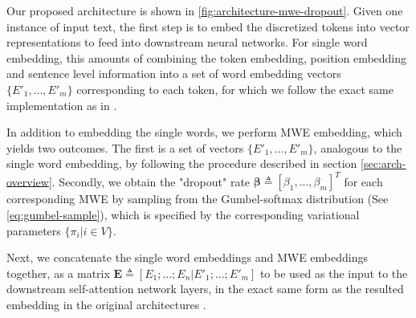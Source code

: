 

Our proposed architecture is shown in \autoref{fig:architecture-mwe-dropout}. 
Given one instance of input text, the first step is to embed the discretized tokens into vector representations to feed into downstream neural networks.
For single word embedding, this amounts of combining the token embedding, position embedding and sentence level information into 
a set of word embedding vectors $\{E'_1, ..., E'_m\}$ corresponding to each token, for which we follow the exact same implementation as in \cite{devlin2018bert}.

In addition to embedding the single words, 
we perform MWE embedding, which yields two outcomes.
The first is a set of vectors $\{E'_1, ..., E'_m\}$, analogous to the single word embedding, 
by following the procedure described in section \autoref{sec:arch-overview}. 
Secondly, we obtain the "dropout" rate $\bm{\beta} \triangleq [\beta_1, ..., \beta_m]^T$ for each corresponding MWE 
by sampling from the Gumbel-softmax distribution (See \autoref{eq:gumbel-sample}), which is specified by the corresponding variational parameters $\{\pi_i \vert i \in V\}$.



Next, we concatenate the single word embeddings and MWE embeddings together, as
a matrix $\mathbf{E} \triangleq [E_1; ...; E_n| E'_1; ...; E'_m]$ to be used as the input to the downstream self-attention network layers, 
in the exact same form as the resulted embedding in the original architectures
\cite{vaswani2017attention}.





